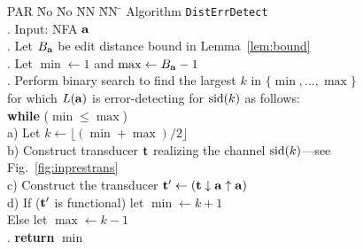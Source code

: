 \documentclass{article}
\theoremstyle{plain}
\theoremstyle{definition}
\theoremstyle{remark}
\newcommand\db{B}             \newcommand\dbold{D}   \newcommand\pssi{\par\smallskip\indent}
\begin{document}
\begin{figure}[ht]
\begin{tabbing}
PAR \= No \= No \= NN \= NN \=\kill
\> Algorithm \texttt{DistErrDetect} \\
.\> Input: NFA $\mathbf{a}$ \hspace{4mm} \\
.\> Let ${\db_\aut}$ be edit distance bound in Lemma~\ref{lem:bound}\\
.\> Let $\min\leftarrow 1$ and
$\max\leftarrow{\db_\aut}-1$ \\
.\> Perform binary search to find the largest $k$ in
      $\{\min,\ldots,\max\}$ \\
\>  \> for which $L(\mathbf{a})$ is error-detecting for $\mathrm{sid}(k)$ as follows: \\
\>  \>  \textbf{while} ($\min\le \max$)\\
\>  \>  a)\> Let $k\leftarrow\lfloor(\min+\max)/2\rfloor$\\
\>   \> b)\> Construct transducer $\mathbf{t}$ realizing the channel $\mathrm{sid}(k)$---see Fig.~\ref{fig:inprestrans}\\
\>   \> c)\> Construct the transducer $\mathbf{t}'\leftarrow(\mathbf{t}\downarrow\mathbf{a}\uparrow\mathbf{a})$\\
\>   \> d)\> If ($\mathbf{t}'$ is functional)  let $\min\leftarrow k+1$\\
\>   \> \>  Else  let $\max\leftarrow k-1$\\
. \> \textbf{return} $\min$
\end{tabbing}
\end{figure}
\end{document}
